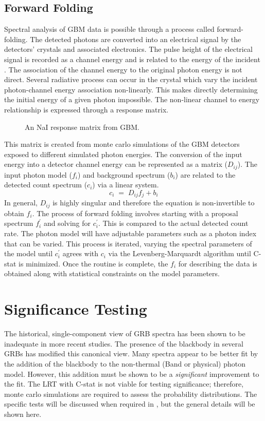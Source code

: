 \subsection{Forward Folding}
\label{sec:ff}
Spectral analysis of GBM data is possible through a process called
forward-folding. The detected {\gray} photons are converted into
an electrical signal by the detectors' crystals and associated
electronics. The pulse height of the electrical signal is recorded as
a channel energy and is related to the energy of the incident
\gray . The association of the channel energy to the original
photon energy is not direct. Several radiative process can occur in
the crystal which vary the incident photon-channel
energy association non-linearly. This makes directly determining the
initial energy of a given photon impossible. The non-linear channel to
energy relationship is expressed through a response matrix.
\begin{figure}[h]
  \centering
  \caption{An NaI response matrix from
    GBM.}
\end{figure}
This matrix is created from monte carlo simulations of the GBM
detectors exposed to different simulated photon energies. The
conversion of the input energy into a detector channel energy can be
represented as a matrix ($D_{ij}$). The input photon model
($f_i$) and background spectrum (${b_i}$) are related to the
detected count spectrum (${c_i}$) via a linear system.
\begin{equation}
\label{eqn:folding}
c_i\;=\;D_{ij}f_j+b_i
\end{equation}
In general, $D_{ij}$ is highly singular and therefore the equation is
non-invertible to obtain $f_i$. The process of forward folding
involves starting with a proposal spectrum $f^{\prime}_i$ and solving
for $c^{\prime}_i$. This is compared to the actual detected count
rate. The photon model will have adjustable parameters such as a
photon index that can be varied. This process is iterated, varying the
spectral parameters of the model until $c^{\prime}_i$ agrees with
$c_i$ via the Levenberg-Marquardt algorithm until C-stat is
minimized. Once the routine is complete, the $f_i$ for describing the
data is obtained along with statistical constraints on the model
parameters.

\section{Significance Testing}
\label{sec:sigtest}
The historical, single-component view of GRB spectra has been shown to
be inadequate in more recent studies. The presence of the blackbody in
several GRBs has modified this canonical view. Many spectra appear to
be better fit by the addition of the blackbody to the non-thermal
(Band or physical) photon model. However, this addition must be shown
to be a \emph{significant} improvement to the fit. The LRT with C-stat
is not viable for testing significance; therefore, monte carlo
simulations are required to assess the probability distributions. The
specific tests will be discussed when required
in , but the general details will be shown
here.


